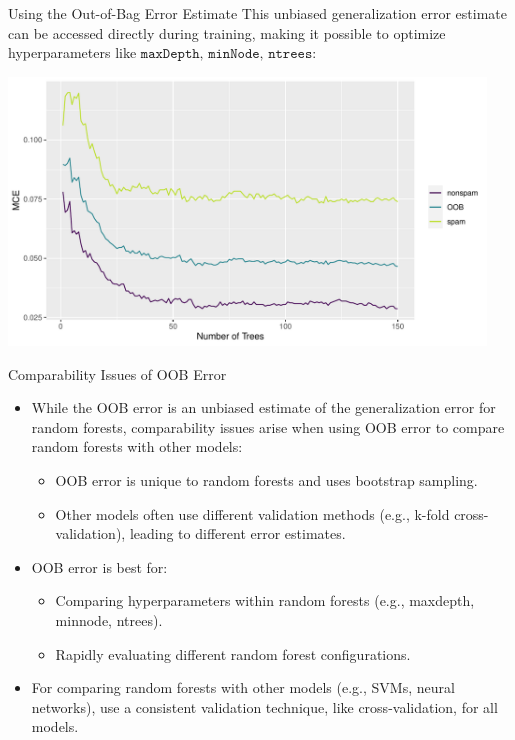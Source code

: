 \documentclass[11pt,compress,t,notes=noshow,xcolor=table]{beamer}
\begin{document}
\begin{vbframe}{Using the Out-of-Bag Error Estimate}
This unbiased generalization error estimate can be accessed directly during training, making it possible to optimize hyperparameters like $\texttt{maxDepth, minNode, ntrees}$:

\begin{knitrout}\scriptsize
{}\color{fgcolor}

{\centering \includegraphics[width=0.95\textwidth]{figure/forest-oob.pdf} 

}
\end{knitrout}

\end{vbframe}

\begin{vbframe}{Comparability Issues of OOB Error}

\begin{itemize}
\item While the OOB error is an unbiased estimate of the generalization error for random forests, comparability issues arise when using OOB error to compare random forests with other models:
\begin{itemize}
\item OOB error is unique to random forests and uses bootstrap sampling.
\item Other models often use different validation methods (e.g., k-fold cross-validation), leading to different error estimates.
\end{itemize}
\item OOB error is best for:
\begin{itemize}
\item Comparing hyperparameters within random forests (e.g., maxdepth, minnode, ntrees).
\item Rapidly evaluating different random forest configurations.
\end{itemize}
\item For comparing random forests with other models (e.g., SVMs, neural networks), use a consistent validation technique, like cross-validation, for all models.
\end{itemize}

\end{vbframe}

\endlecture
\end{document}
